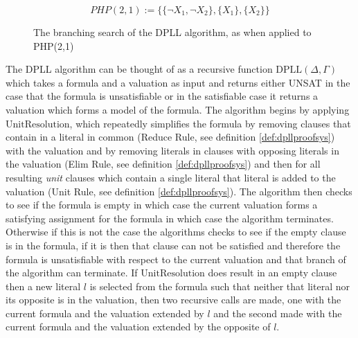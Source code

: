 $$PHP(2,1) := \{\{\neg X_1, \neg X_2\}, \{ X_1 \}, \{ X_2 \} \}$$


\bigskip
\begin{figure}[h!]
\begin{center}
\end{center}
\caption{The branching search of the DPLL algorithm, as when applied to PHP(2,1)}
\end{figure}
\bigskip

The DPLL algorithm can be thought of as a recursive function $\mathrm{DPLL}(\Delta,\Gamma)$ which takes a formula and a valuation as input and returns either UNSAT in the case that the formula is unsatisfiable or in the satisfiable case it returns a valuation which forms a model of the formula.  The algorithm begins by applying $\mathrm{UnitResolution}$, which repeatedly simplifies the formula by removing clauses that contain in a literal in common (Reduce Rule, see definition \ref{def:dpllproofsys}) with the valuation and by removing literals in clauses with opposing literals in the valuation (Elim Rule, see definition \ref{def:dpllproofsys}) and then for all resulting \emph{unit} clauses which contain a single literal that literal is added to the valuation (Unit Rule, see definition \ref{def:dpllproofsys}).  The algorithm then checks to see if the formula is empty in which case the current valuation forms a satisfying assignment for the formula in which case the algorithm terminates.  Otherwise if this is not the case the algorithms checks to see if the empty clause is in the formula, if it is then that clause can not be satisfied and therefore the formula is unsatisfiable with respect to the current valuation and that branch of the algorithm can terminate. If $\mathrm{UnitResolution}$ does result in an empty clause then a new literal $l$ is selected from the formula such that neither that literal nor its opposite is in the valuation, then two recursive calls are made, one with the current formula and the valuation extended by $l$ and the second made with the current formula and the valuation extended by the opposite of $l$. 


